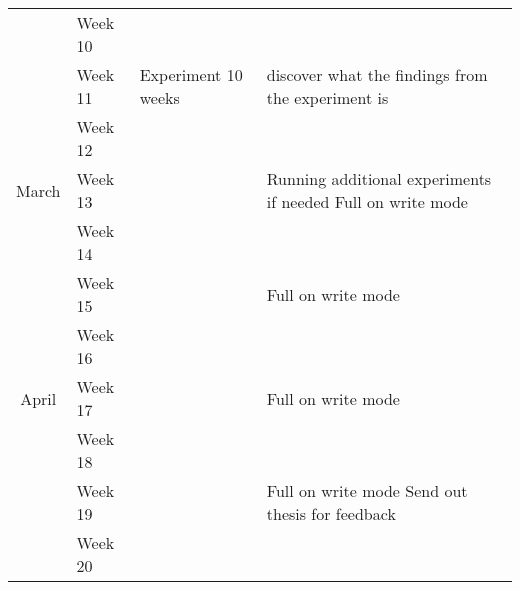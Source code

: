 \documentclass[
  a4paper,  %
  twoside,  %
  bibliography=totoc,
  headsepline,
  cleardoublepage=empty,
  parskip=half,
  draft=false
]{scrbook}
\begin{document}
\begin{tabular}{clll}
                                & Week 10      &                                             &                                                                                                                            \\
                                & Week 11      &  \multirow{-10}{*}{Experiment 10 weeks}     & \multirow{-2}{*}{discover what the findings from the experiment is}                                                         \\
                                & Week 12      &                                             &                                                                                                                            \\
\multirow{-5}{*}{March}         & Week 13      &                                             & \multirow{-2}{*}{Running additional experiments if needed  Full on write mode} \\
                                & Week 14      &                                             &                                                                                                                            \\
                                & Week 15      &                                             & \multirow{-2}{*}{Full on write mode}                                                                                       \\
                                & Week 16      &                                             &                                                                                                                            \\
\multirow{-4}{*}{April}         & Week 17      &                                             & \multirow{-2}{*}{Full on write mode}                                                                                       \\
                                & Week 18      &                                             &                                                                                                                            \\
                                & Week 19      &                                             & \multirow{-2}{*}{Full on write mode    Send out thesis for feedback}             \\
                                & Week 20      &                                             &                                                                                                                            \\

\end{tabular}
\end{document}
